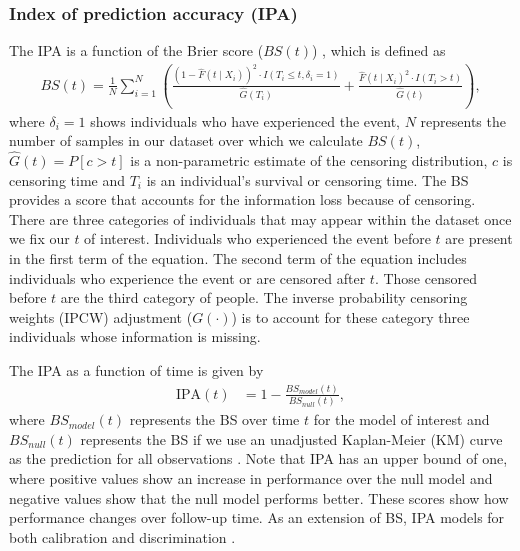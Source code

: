 \documentclass[APA,LATO1COL]{WileyNJD-v2}
\begin{document}
\hypertarget{index-of-prediction-accuracy-ipa}{%
\subsubsection{Index of prediction accuracy (IPA)}\label{index-of-prediction-accuracy-ipa}}

The IPA is a function of the Brier score (\(BS(t)\)) \citep{graf1999},
which is defined as \begin{align}\label{eqn:bs}
BS(t)=\frac{1}{N}\sum^{N}_{i=1}\left(\frac{\left(1 - \widehat{F}(t \mid X_{i})\right)^{2}\cdot I(T_{i}\leq t,\delta_{i}=1)}{\widehat{G}(T_{i})} + \frac{\widehat{F}(t\mid X_{i})^{2}\cdot I(T_{i}>t)}{\widehat{G}(t)}\right),
\end{align} where \(\delta_{i}=1\) shows individuals who have
experienced the event, \(N\) represents the number of samples in our
dataset over which we calculate \(BS(t)\), \(\widehat{G}(t)=P[c>t]\) is
a non-parametric estimate of the censoring distribution, \(c\) is
censoring time and \(T_{i}\) is an individual's survival or censoring
time. The BS provides a score that accounts for the information
loss because of censoring. There are three categories of individuals
that may appear within the dataset once we fix our \(t\) of interest.
Individuals who experienced the event before \(t\) are present in the
first term of the equation. The second term of the equation includes
individuals who experience the event or are censored after \(t\). Those
censored before \(t\) are the third category of people. The inverse
probability censoring weights (IPCW) adjustment (\(G(\cdot)\)) is to
account for these category three individuals whose information is
missing. 

The IPA as a function of time is given by \begin{align}
\textrm{IPA}(t) &= 1-\frac{BS_{model}(t)}{BS_{null}(t)}, \nonumber
\end{align} where \(BS_{model}(t)\) represents the BS over time
\(t\) for the model of interest and \(BS_{null}(t)\) represents the
BS if we use an unadjusted Kaplan-Meier (KM) curve as the
prediction for all observations \citep{kattan2018index}. Note that IPA
has an upper bound of one, where positive values show an increase in
performance over the null model and negative values show that the null
model performs better. These scores show how performance changes over
follow-up time. As an extension of BS, IPA models for both calibration
and discrimination\citep{graf1999} \citep{kattan2018index}.
\end{document}
